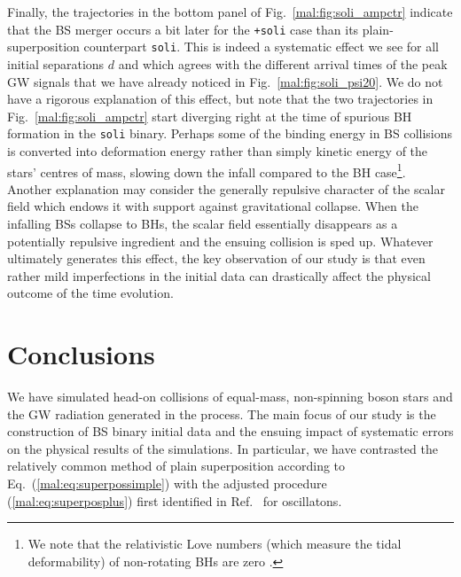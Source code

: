 Finally, the trajectories in the bottom panel of
Fig.~\ref{mal:fig:soli_ampctr} indicate that the BS merger occurs a bit later
for the {\tt +soli} case than its plain-superposition counterpart
{\tt soli}. This is indeed a systematic effect we see for all
initial separations $d$ and which agrees with the different arrival
times of the peak GW signals that we have already noticed in
Fig.~\ref{mal:fig:soli_psi20}. We do not have a rigorous explanation
of this effect, but note that the two trajectories in
Fig.~\ref{mal:fig:soli_ampctr} start diverging right at the time of
spurious BH formation in the {\tt soli} binary. Perhaps some of the
binding energy in BS collisions is converted into deformation 
energy rather than simply kinetic energy of the stars' centres of mass,
slowing down the infall compared to the BH
case\footnote{We note that the relativistic Love numbers
(which measure the tidal deformability)
of non-rotating BHs are zero
\cite{Binnington:2009bb}.}.
Another explanation
may consider the generally repulsive character of the scalar field
which endows it with support against gravitational collapse. When the
infalling BSs collapse to BHs, the scalar field essentially disappears
as a potentially repulsive ingredient and the ensuing collision
is sped up. Whatever ultimately generates this effect, the key
observation of our study is that even rather mild imperfections in the initial
data can drastically affect the physical outcome of the time evolution.



\section{Conclusions}
\label{mal:sec:conclusions}
%
We have simulated head-on collisions of equal-mass,
non-spinning boson stars and the GW radiation generated in the process.
The main focus of our study is the construction of BS binary initial
data and the ensuing impact of systematic errors on the physical
results of the simulations. In particular, we have contrasted the
relatively common method of
plain superposition according to Eq.~(\ref{mal:eq:superpossimple}) with
the adjusted procedure (\ref{mal:eq:superposplus})
first identified in Ref.~\cite{Helfer:2018vtq} for oscillatons.

